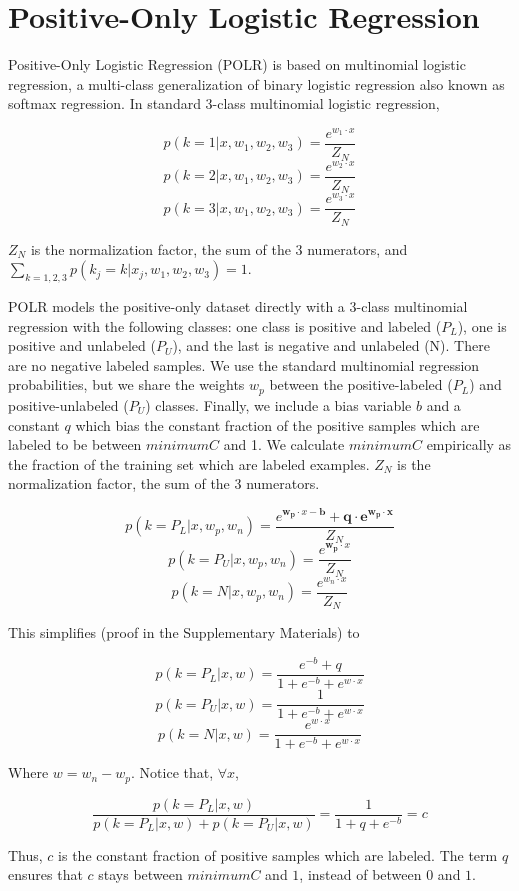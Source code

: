 \documentclass{article}
\begin{document}
\section{Positive-Only Logistic Regression}

Positive-Only Logistic Regression (POLR) is based on multinomial logistic regression, a multi-class generalization of binary logistic regression also known as softmax regression.  In standard 3-class multinomial logistic regression,

$$p(k=1 | x, w_1, w_2, w_3) =  \frac{e^{w_1 \cdot x}}{Z_N}$$
$$p(k=2 | x, w_1, w_2, w_3) =  \frac{e^{w_2 \cdot x}}{Z_N}$$
$$p(k=3 | x, w_1, w_2, w_3) =  \frac{e^{w_3 \cdot x}}{Z_N}$$

$Z_N$ is the normalization factor, the sum of the 3 numerators, and $\sum_{k=1,2,3}{p(k_j=k|x_j, w_1, w_2, w_3)} = 1$.

POLR models the positive-only dataset directly with a 3-class multinomial regression with the following classes: one class is positive and labeled ($P_L$), one is positive and unlabeled ($P_U$), and the last is negative and unlabeled (N).  There are no negative labeled samples.  We use the standard multinomial regression probabilities, but we share the weights $w_p$ between the positive-labeled ($P_L$) and positive-unlabeled ($P_U$) classes. Finally, we include a bias variable $b$ and a constant $q$ which bias the constant fraction of the positive samples which are labeled to be between $minimumC$ and 1.  We calculate $minimumC$ empirically as the fraction of the training set which are labeled examples.  $Z_N$ is the normalization factor, the sum of the 3 numerators.

$$p(k=P_L | x, w_p, w_n) =  \frac{e^{\mathbf{w_p} \cdot x - \mathbf{b}} + \mathbf{q \cdot e^{w_p \cdot x}}}{Z_N}$$
$$p(k=P_U | x, w_p, w_n) =  \frac{e^{\mathbf{w_p} \cdot x}}{Z_N}$$
$$p(k=N | x, w_p, w_n) =  \frac{e^{w_n \cdot x}}{Z_N}$$

This simplifies (proof in the Supplementary Materials) to

$$ p(k=P_L | x, w) = \frac{e^{-b} + q}{1 + e^{-b} + e^{w \cdot x}}$$
$$ p(k=P_U | x, w) =  \frac{1}{1 + e^{-b} + e^{w \cdot x}}$$
$$ p(k=N | x, w) = \frac{e^{w \cdot x}}{1 + e^{-b} + e^{w \cdot x}}$$

Where $w = w_n - w_p$. Notice that, $\forall x$,

$$\frac{p(k=P_L | x, w)}{p(k=P_L | x, w) + p(k=P_U | x, w)} = \frac{1}{1 + q + e^{-b}} = c$$

Thus, $c$ is the constant fraction of positive samples which are labeled. The term $q$ ensures that $c$ stays between $minimumC$ and $1$, instead of  between $0$ and $1$.
\end{document}
